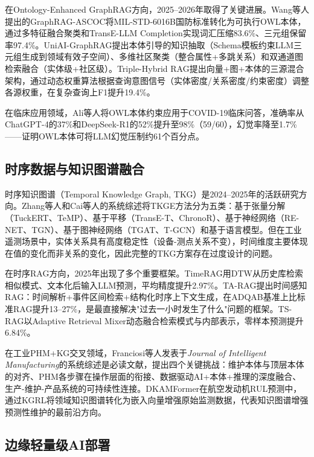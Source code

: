 \documentclass[12pt,a4paper]{article}
\begin{document}
在Ontology-Enhanced GraphRAG方向，2025--2026年取得了关键进展。Wang等人提出的GraphRAG-ASCOC\cite{wang2025graphrag}将MIL-STD-6016B国防标准转化为可执行OWL本体，通过多特征融合聚类和TransE-LLM Completion实现词汇压缩83.6\%、三元组保留率97.4\%。UniAI-GraphRAG\cite{wang2026uniai}提出本体引导的知识抽取（Schema模板约束LLM三元组生成到领域有效子空间）、多维社区聚类（整合属性+多跳关系）和双通道图检索融合（实体级+社区级）。Triple-Hybrid RAG\cite{shin2026triple}提出向量+图+本体的三源混合架构，通过动态权重算法根据查询意图信号（实体密度/关系密度/约束密度）调整各源权重，在复杂查询上F1提升19.4\%。

在临床应用领域，Ali等人\cite{ali2025ontology}将OWL本体约束应用于COVID-19临床问答，准确率从ChatGPT-4的37\%和DeepSeek-R1的52\%提升至98\%（59/60），幻觉率降至1.7\%——证明OWL本体可将LLM幻觉压制约61个百分点。

\subsection{时序数据与知识图谱融合}

时序知识图谱（Temporal Knowledge Graph, TKG）是2024--2025年的活跃研究方向。Zhang等人\cite{zhang2024tkg}和Cai等人\cite{cai2024tkg}的系统综述将TKGE方法分为五类：基于张量分解（TuckERT、TeMP）、基于平移（TransE-T、ChronoR）、基于神经网络（RE-NET、TGN）、基于图神经网络（TGAT、T-GCN）和基于语言模型。但在工业遥测场景中，实体关系具有高度稳定性（设备-测点关系不变），时间维度主要体现在值的变化而非关系的变化，因此完整的TKG方案存在过度设计的问题。

在时序RAG方向，2025年出现了多个重要框架。TimeRAG\cite{yang2025timerag}用DTW从历史库检索相似模式、文本化后输入LLM预测，平均精度提升2.97\%。TA-RAG\cite{lau2025tarag}提出时间感知RAG：时间解析+事件区间检索+结构化时序上下文生成，在ADQAB基准上比标准RAG提升13--27\%，是最直接解决"过去一小时发生了什么"问题的框架。TS-RAG\cite{ning2025tsrag}以Adaptive Retrieval Mixer动态融合检索模式与内部表示，零样本预测提升6.84\%。

在工业PHM+KG交叉领域，Franciosi等人\cite{franciosi2024ontologies}发表于\emph{Journal of Intelligent Manufacturing}的系统综述是必读文献，提出四个关键挑战：维护本体与顶层本体的对齐、PHM各步骤在操作层面的衔接、数据驱动AI+本体+推理的深度融合、生产-维护-产品系统的可持续性连接。DKAMFormer\cite{dkamformer2025}在航空发动机RUL预测中，通过KGRL将领域知识图谱转化为嵌入向量增强原始监测数据，代表知识图谱增强预测性维护的最前沿方向。

\subsection{边缘轻量级AI部署}
\end{document}
